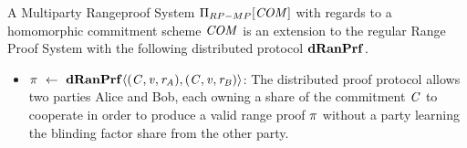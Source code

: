 \begin{definition}\label{def:pre:mp-rangeproof}
    A Multiparty Rangeproof System $\Pi_{RP-MP}[\mathit{COM}]$ with regards to a homomorphic commitment scheme $\mathit{COM}$ is an extension to the regular Range Proof System with the following
    distributed protocol $\mathbf{dRanPrf}$.
    \begin{itemize}
        \item $\pi ~\leftarrow~ \mathbf{dRanPrf} \langle(\mathit{C},\mathit{v},\mathit{r}_{\mathit{A}}),(\mathit{C},\mathit{v},\mathit{r}_{\mathit{B}})\rangle$: The distributed proof protocol allows two parties Alice and Bob, each owning a share of the
        commitment $\mathit{C}$ to cooperate in order to produce a valid range proof $\pi$ without a party learning the blinding factor share from the other party.
    \end{itemize}
\end{definition}